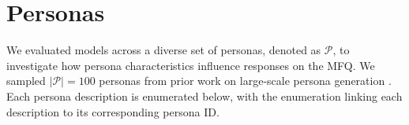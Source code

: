 \documentclass{article}
\begin{document}
\section{Personas}
\label{app:personas}
We evaluated models across a diverse set of personas, denoted as $\mathcal{P}$, to investigate how persona characteristics influence responses on the MFQ. We sampled $|\mathcal{P}| = 100$ personas from prior work on large-scale persona generation \citep{ge2025scalingsyntheticdatacreation}. Each persona description is enumerated below, with the enumeration linking each description to its corresponding persona ID.

\end{document}
